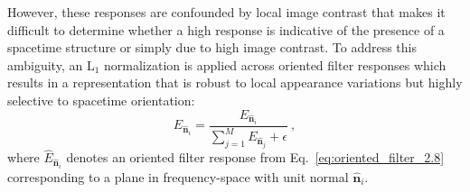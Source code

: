 However, these responses are confounded by local image
contrast that makes 
it difficult to determine
whether a high response is indicative of the presence of
a spacetime structure or simply due to high image
contrast.
To address this ambiguity, an $\textrm{L}_1$
normalization is applied across oriented filter responses which
results in a representation that is robust to local
appearance variations but highly selective to 
spacetime orientation:
\begin{equation}
	\hat{E}_{\hat{\mathbf{n}}_i} = \frac{E_{\hat{\mathbf{n}}_i}}{\sum_{j = 1}^{M}{E_{\hat{\mathbf{n}}_j}} + \epsilon} \ ,
\end{equation}
where $\hat{E}_{\hat{\mathbf{n}}_i}$ denotes an oriented filter response from Eq.\ \ref{eq:oriented_filter_2.8} corresponding to a plane in frequency-space with unit normal $\hat{\mathbf{n}}_i$.
